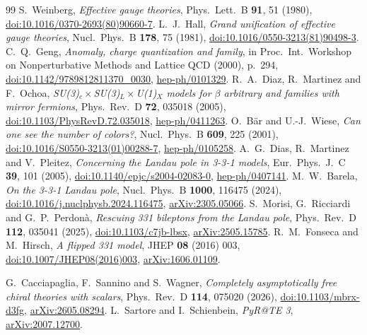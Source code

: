 \documentclass[11pt,a4paper]{article}
\begin{document}
\begin{thebibliography}{99}
 S.~Weinberg, \emph{Effective gauge theories}, Phys.\ Lett.\ B \textbf{91}, 51 (1980), \href{https://doi.org/10.1016/0370-2693(80)90660-7}{doi:10.1016/0370-2693(80)90660-7}.
 L.~J.~Hall, \emph{Grand unification of effective gauge theories}, Nucl.\ Phys.\ B \textbf{178}, 75 (1981), \href{https://doi.org/10.1016/0550-3213(81)90498-3}{doi:10.1016/0550-3213(81)90498-3}.
 C.~Q.~Geng, \emph{Anomaly, charge quantization and family}, in Proc.\ Int.\ Workshop on Nonperturbative Methods and Lattice QCD (2000), p.~294, \href{https://doi.org/10.1142/9789812811370_0030}{doi:10.1142/9789812811370\_0030}, \href{https://arxiv.org/abs/hep-ph/0101329}{hep-ph/0101329}.
 R.~A.~Diaz, R.~Martinez and F.~Ochoa, \emph{SU(3)$_c\times$SU(3)$_L\times$U(1)$_X$ models for $\beta$ arbitrary and families with mirror fermions}, Phys.\ Rev.\ D \textbf{72}, 035018 (2005), \href{https://doi.org/10.1103/PhysRevD.72.035018}{doi:10.1103/PhysRevD.72.035018}, \href{https://arxiv.org/abs/hep-ph/0411263}{hep-ph/0411263}.
 O.~B\"ar and U.-J.~Wiese, \emph{Can one see the number of colors?}, Nucl.\ Phys.\ B \textbf{609}, 225 (2001), \href{https://doi.org/10.1016/S0550-3213(01)00288-7}{doi:10.1016/S0550-3213(01)00288-7}, \href{https://arxiv.org/abs/hep-ph/0105258}{hep-ph/0105258}.
 A.~G.~Dias, R.~Martinez and V.~Pleitez, \emph{Concerning the Landau pole in 3-3-1 models}, Eur.\ Phys.\ J.\ C \textbf{39}, 101 (2005), \href{https://doi.org/10.1140/epjc/s2004-02083-0}{doi:10.1140/epjc/s2004-02083-0}, \href{https://arxiv.org/abs/hep-ph/0407141}{hep-ph/0407141}.
 M.~W.~Barela, \emph{On the 3-3-1 Landau pole}, Nucl.\ Phys.\ B \textbf{1000}, 116475 (2024), \href{https://doi.org/10.1016/j.nuclphysb.2024.116475}{doi:10.1016/j.nuclphysb.2024.116475}, \href{https://arxiv.org/abs/2305.05066}{arXiv:2305.05066}.
 S.~Morisi, G.~Ricciardi and G.~P.~Perdon\`a, \emph{Rescuing 331 bileptons from the Landau pole}, Phys.\ Rev.\ D \textbf{112}, 035041 (2025), \href{https://doi.org/10.1103/c7jb-lbsx}{doi:10.1103/c7jb-lbsx}, \href{https://arxiv.org/abs/2505.15785}{arXiv:2505.15785}.
 R.~M.~Fonseca and M.~Hirsch, \emph{A flipped 331 model}, JHEP \textbf{08} (2016) 003, \href{https://doi.org/10.1007/JHEP08(2016)003}{doi:10.1007/JHEP08(2016)003}, \href{https://arxiv.org/abs/1606.01109}{arXiv:1606.01109}.

 G.~Cacciapaglia, F.~Sannino and S.~Wagner, \emph{Completely asymptotically free chiral theories with scalars}, Phys.\ Rev.\ D \textbf{114}, 075020 (2026), \href{https://doi.org/10.1103/mbrx-d3fg}{doi:10.1103/mbrx-d3fg}, \href{https://arxiv.org/abs/2605.08294}{arXiv:2605.08294}.
 L.~Sartore and I.~Schienbein, \emph{PyR@TE 3}, \href{https://arxiv.org/abs/2007.12700}{arXiv:2007.12700}.


\end{thebibliography}
\end{document}
